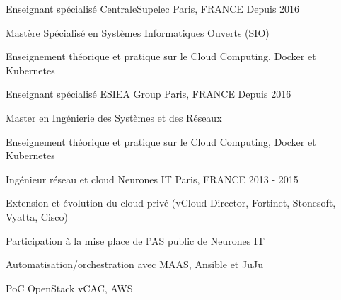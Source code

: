 \begin{cventries}
  \cventry
    {Enseignant spécialisé} %
    {CentraleSupelec}
    {Paris, FRANCE} %
    {Depuis 2016} %
    {
      \begin{cvitems} %
      \item {Mastère Spécialisé en Systèmes Informatiques Ouverts (SIO)}
      \item {Enseignement théorique et pratique sur le Cloud Computing, Docker et Kubernetes}
      \end{cvitems}
    }
 \cventry
    {Enseignant spécialisé} %
    {ESIEA Group}
    {Paris, FRANCE} %
    {Depuis 2016} %
    {
      \begin{cvitems} %
      \item {Master en Ingénierie des Systèmes et des Réseaux}
      \item {Enseignement théorique et pratique sur le Cloud Computing, Docker et Kubernetes}
      \end{cvitems}
    }

  \cventry
    {Ingénieur réseau et cloud}
    {Neurones IT} %
    {Paris, FRANCE} %
    {2013 - 2015} %
    {
      \begin{cvitems} %
      \item {Extension et évolution du cloud privé (vCloud Director, Fortinet, Stonesoft, Vyatta, Cisco)}
      \item {Participation à la mise place de l'AS public de Neurones IT}
      \item {Automatisation/orchestration avec MAAS, Ansible et JuJu}
      \item {PoC OpenStack vCAC, AWS}
      \end{cvitems}
    }

\end{cventries}
